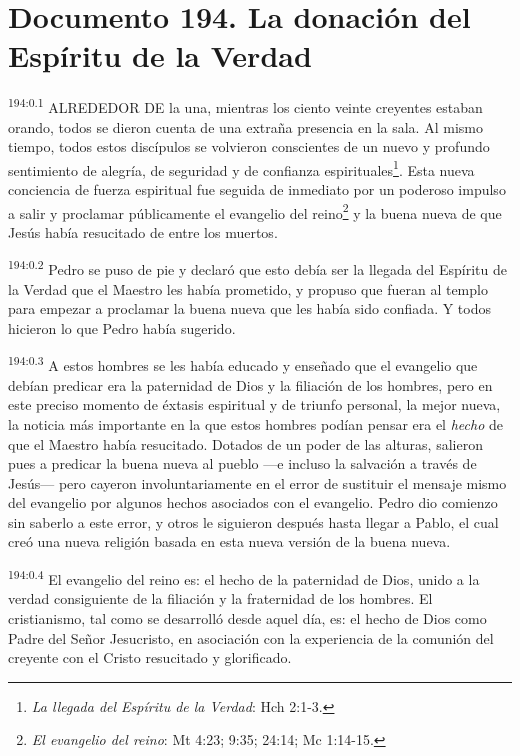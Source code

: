 \chapter{Documento 194. La donación del Espíritu de la Verdad}
\par
\textsuperscript{194:0.1} ALREDEDOR DE la una, mientras los ciento veinte creyentes estaban orando, todos se dieron cuenta de una extraña presencia en la sala. Al mismo tiempo, todos estos discípulos se volvieron conscientes de un nuevo y profundo sentimiento de alegría, de seguridad y de confianza espirituales\footnote{\textit{La llegada del Espíritu de la Verdad}: Hch 2:1-3.}. Esta nueva conciencia de fuerza espiritual fue seguida de inmediato por un poderoso impulso a salir y proclamar públicamente el evangelio del reino\footnote{\textit{El evangelio del reino}: Mt 4:23; 9:35; 24:14; Mc 1:14-15.} y la buena nueva de que Jesús había resucitado de entre los muertos.

\par
\textsuperscript{194:0.2} Pedro se puso de pie y declaró que esto debía ser la llegada del Espíritu de la Verdad que el Maestro les había prometido, y propuso que fueran al templo para empezar a proclamar la buena nueva que les había sido confiada. Y todos hicieron lo que Pedro había sugerido.

\par
\textsuperscript{194:0.3} A estos hombres se les había educado y enseñado que el evangelio que debían predicar era la paternidad de Dios y la filiación de los hombres, pero en este preciso momento de éxtasis espiritual y de triunfo personal, la mejor nueva, la noticia más importante en la que estos hombres podían pensar era el \textit{hecho} de que el Maestro había resucitado. Dotados de un poder de las alturas, salieron pues a predicar la buena nueva al pueblo ---e incluso la salvación a través de Jesús--- pero cayeron involuntariamente en el error de sustituir el mensaje mismo del evangelio por algunos hechos asociados con el evangelio. Pedro dio comienzo sin saberlo a este error, y otros le siguieron después hasta llegar a Pablo, el cual creó una nueva religión basada en esta nueva versión de la buena nueva.

\par
\textsuperscript{194:0.4} El evangelio del reino es: el hecho de la paternidad de Dios, unido a la verdad consiguiente de la filiación y la fraternidad de los hombres. El cristianismo, tal como se desarrolló desde aquel día, es: el hecho de Dios como Padre del Señor Jesucristo, en asociación con la experiencia de la comunión del creyente con el Cristo resucitado y glorificado.

